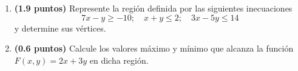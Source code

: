 
\begin{enumerate}[label=\alph*)]
\item \textbf{(1.9 puntos)} Represente la región definida por las siguientes inecuaciones
\[
7x-y\geq-10;\quad x+y\leq2;\quad 3x-5y\leq14
\]
y determine sus vértices.
\item \textbf{(0.6 puntos)} Calcule los valores máximo y mínimo que alcanza la función $F(x,y)=2x+3y$ en dicha región.
\end{enumerate}
